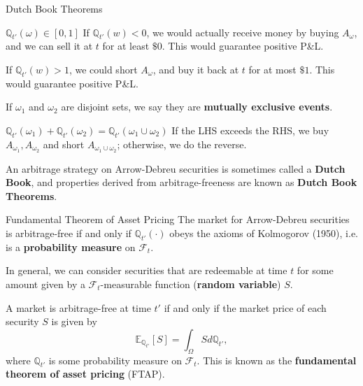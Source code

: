 \documentclass{beamer}
\begin{document}
\begin{frame}{Dutch Book Theorems}
	\begin{block}{$\mathbb{Q}_{t'}(\omega) \in [0,1]$}
		If $\mathbb{Q}_{t'}(w)<0$, we would actually receive money by buying $A_\omega$, and we can sell it at $t$ for at least $\$0$. This would guarantee positive P\&L.

		If $\mathbb{Q}_{t'}(w)>1$, we could short $A_\omega$, and buy it back at $t$ for at most $\$1$. This would guarantee positive P\&L.
	\end{block}

	If $\omega_1$ and $\omega_2$ are disjoint sets, we say they are \textbf{mutually exclusive events}.
	\begin{block}{$\mathbb{Q}_{t'}(\omega_1) + \mathbb{Q}_{t'}(\omega_2) = \mathbb{Q}_{t'}(\omega_1 \cup \omega_2)$}
		If the LHS exceeds the RHS, we buy $A_{\omega_1},A_{\omega_2}$ and short $A_{\omega_1\cup\omega_2}$; otherwise, we do the reverse.
	\end{block}

	An arbitrage strategy on Arrow-Debreu securities is sometimes called a \textbf{Dutch Book}, and properties derived from arbitrage-freeness are known as \textbf{Dutch Book Theorems}.
\end{frame}

\begin{frame}{Fundamental Theorem of Asset Pricing}
	The market for Arrow-Debreu securities is arbitrage-free if and only if $\mathbb{Q}_{t'}(\cdot)$ obeys the axioms of Kolmogorov (1950), i.e. is a \textbf{probability measure} on $\mathcal{F}_t$.

	In general, we can consider securities that are redeemable at time $t$ for some amount given by a $\mathcal{F}_t$-measurable function (\textbf{random variable}) $S$.

	A market is arbitrage-free at time $t'$ if and only if the market price of each security $S$ is given by
	$$\mathbb{E}_{\mathbb{Q}_{t'}}[S] = \int_\Omega S d\mathbb{Q}_{t'},$$
	where $\mathbb{Q}_{t'}$ is some probability measure on $\mathcal{F}_t$. This is known as the \textbf{fundamental theorem of asset pricing} (FTAP).
\end{frame}
\end{document}
